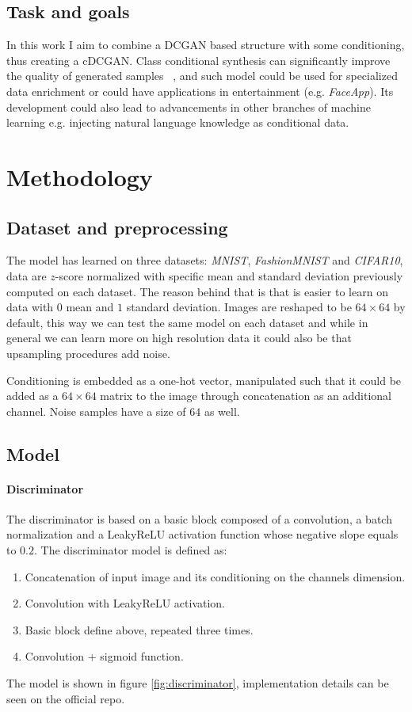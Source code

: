\documentclass[10pt,twocolumn,letterpaper]{article}
\begin{document}
\subsection{Task and goals}
In this work I aim to combine a DCGAN based structure with some conditioning, thus creating a cDCGAN.
Class conditional synthesis can significantly improve the quality of generated samples ~\cite{DBLP:journals/corr/OordKK16}, and such model could be used for specialized data enrichment or could have applications in entertainment (e.g. \textit{FaceApp}).
Its development could also lead to advancements in other branches of machine learning e.g. injecting natural language knowledge as conditional data.

\section{Methodology}

\subsection{Dataset and preprocessing}
The model has learned on three datasets: \textit{MNIST}, \textit{FashionMNIST} and \textit{CIFAR10}, data are $z$-score normalized with specific mean and standard deviation previously computed on each dataset.
The reason behind that is that is easier to learn on data with $0$ mean and $1$ standard deviation.
Images are reshaped to be $64\times64$ by default, this way we can test the same model on each dataset and while in general we can learn more on high resolution data it could also be that upsampling procedures add noise.

Conditioning is embedded as a one-hot vector, manipulated such that it could be added as a $64\times64$ matrix to the image through concatenation as an additional channel.
Noise samples have a size of $64$ as well.

\subsection{Model}
\paragraph{Discriminator}
The discriminator is based on a basic block composed of a convolution, a batch normalization and a LeakyReLU activation function whose negative slope equals to $0.2$.
The discriminator model is defined as:
\begin{enumerate}
   \item Concatenation of input image and its conditioning on the channels dimension.
   \item Convolution with LeakyReLU activation.
   \item Basic block define above, repeated three times.
   \item Convolution + sigmoid function.
\end{enumerate}
The model is shown in figure \ref{fig:discriminator}, implementation details can be seen on the official repo.
\end{document}
